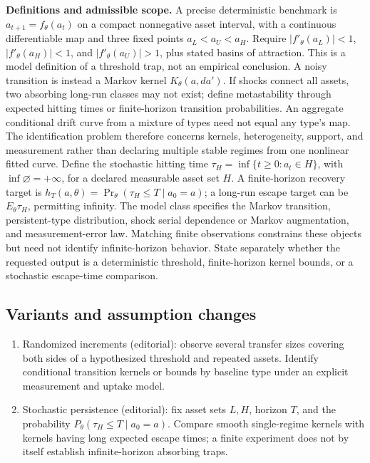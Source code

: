 \documentclass[11pt,a4paper]{article}
\begin{document}
\textbf{Definitions and admissible scope.} A precise deterministic benchmark is \(a_{t+1}=f_\theta(a_t)\) on a compact nonnegative asset interval, with a continuous differentiable map and three fixed points \(a_L<a_U<a_H\). Require \(|f'_\theta(a_L)|<1\), \(|f'_\theta(a_H)|<1\), and \(|f'_\theta(a_U)|>1\), plus stated basins of attraction. This is a model definition of a threshold trap, not an empirical conclusion. A noisy transition is instead a Markov kernel \(K_\theta(a,da')\). If shocks connect all assets, two absorbing long-run classes may not exist; define metastability through expected hitting times or finite-horizon transition probabilities. An aggregate conditional drift curve from a mixture of types need not equal any type's map. The identification problem therefore concerns kernels, heterogeneity, support, and measurement rather than declaring multiple stable regimes from one nonlinear fitted curve. Define the stochastic hitting time \(\tau_H=\inf\{t\ge0:a_t\in H\}\), with \(\inf\varnothing=+\infty\), for a declared measurable asset set \(H\). A finite-horizon recovery target is \(h_T(a,\theta)=\Pr_\theta(\tau_H\le T\mid a_0=a)\); a long-run escape target can be \(E_\theta\tau_H\), permitting infinity. The model class specifies the Markov transition, persistent-type distribution, shock serial dependence or Markov augmentation, and measurement-error law. Matching finite observations constrains these objects but need not identify infinite-horizon behavior. State separately whether the requested output is a deterministic threshold, finite-horizon kernel bounds, or a stochastic escape-time comparison.
\subsection*{Variants and assumption changes}
\begin{enumerate}
\item Randomized increments (editorial): observe several transfer sizes covering both sides of a hypothesized threshold and repeated assets. Identify conditional transition kernels or bounds by baseline type under an explicit measurement and uptake model.
\item Stochastic persistence (editorial): fix asset sets \(L,H\), horizon \(T\), and the probability \(P_\theta(\tau_H\le T\mid a_0=a)\). Compare smooth single-regime kernels with kernels having long expected escape times; a finite experiment does not by itself establish infinite-horizon absorbing traps.
\end{enumerate}
\end{document}
